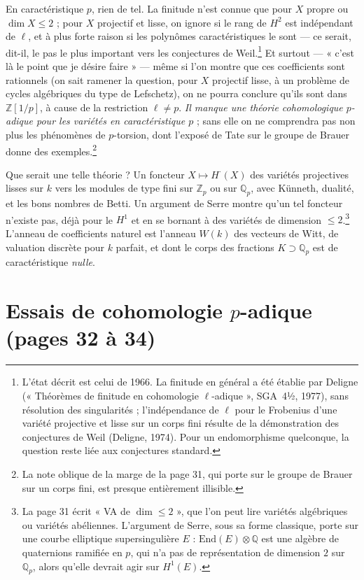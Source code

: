 \documentclass[11pt,a4paper]{article}
\begin{document}
En caractéristique $p$, rien de tel. La finitude n'est connue que pour $X$
propre ou $\dim X \leq 2$ ; pour $X$ projectif et lisse, on ignore si le
rang de $H^{2}$ est indépendant de $\ell$, et à plus forte raison si les
polynômes caractéristiques le sont — ce serait, dit-il, le pas le plus
important vers les conjectures de Weil.\footnote{L'état décrit est celui de
1966. La finitude en général a été établie par Deligne
(« Théorèmes de finitude en cohomologie $\ell$-adique », SGA~4½, 1977), sans
résolution des singularités ; l'indépendance de $\ell$ pour le Frobenius
d'une variété projective et lisse sur un corps fini résulte de la
démonstration des conjectures de Weil (Deligne, 1974). Pour un endomorphisme
quelconque, la question reste liée aux conjectures standard.} Et surtout —
« c'est là le point que je désire faire » — même si l'on montre que ces
coefficients sont rationnels (on sait ramener la question, pour $X$ projectif
lisse, à un problème de cycles algébriques du type de Lefschetz), on ne pourra
conclure qu'ils sont dans $\mathbb{Z}[1/p]$, à cause de la restriction
$\ell \neq p$. \emph{Il manque une théorie cohomologique $p$-adique pour les
variétés en caractéristique $p$} ; sans elle on ne comprendra pas non plus
les phénomènes de $p$-torsion, dont l'exposé de Tate sur le groupe de Brauer
donne des exemples.\footnote{La note oblique de la marge de la page 31, qui
porte sur le groupe de Brauer sur un corps fini, est presque entièrement
illisible.}

Que serait une telle théorie ? Un foncteur $X \mapsto H^{\cdot}(X)$ des
variétés projectives lisses sur $k$ vers les modules de type fini sur
$\mathbb{Z}_p$ ou sur $\mathbb{Q}_p$, avec Künneth, dualité, et les bons
nombres de Betti. Un argument de Serre montre qu'un tel foncteur n'existe
pas, déjà pour le $H^{1}$ et en se bornant à des variétés de dimension
$\leq 2$.\footnote{La page 31 écrit « VA de $\dim \leq 2$ », que l'on peut
lire variétés algébriques ou variétés abéliennes. L'argument de Serre, sous
sa forme classique, porte sur une courbe elliptique supersingulière $E$ :
$\mathrm{End}(E) \otimes \mathbb{Q}$ est une algèbre de quaternions ramifiée
en $p$, qui n'a pas de représentation de dimension $2$ sur $\mathbb{Q}_p$,
alors qu'elle devrait agir sur $H^{1}(E)$.} L'anneau de coefficients naturel
est l'anneau $W(k)$ des vecteurs de Witt, de valuation discrète pour $k$
parfait, et dont le corps des fractions $K \supset \mathbb{Q}_p$ est de
caractéristique \emph{nulle}.

\section*{Essais de cohomologie $p$-adique (pages 32 à 34)}
\end{document}
